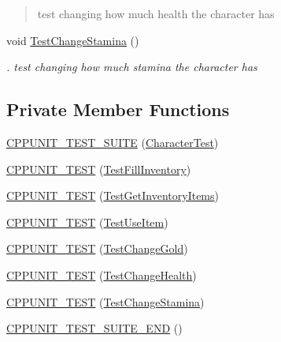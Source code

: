\begin{DoxyCompactItemize}
\begin{DoxyCompactList}\small\item\em \begin{quotation}
test changing how much health the character has \end{quotation}
\end{DoxyCompactList}\item 
void \hyperlink{classCharacterTest_ac61fb4a8c3c9b4a3f1d8e70856d4c9e0}{Test\-Change\-Stamina} ()
\begin{DoxyCompactList}\small\item\em . test changing how much stamina the character has \end{DoxyCompactList}\end{DoxyCompactItemize}
\subsection*{Private Member Functions}
\begin{DoxyCompactItemize}
\item 
\hyperlink{classCharacterTest_a9882f04c10eedb154b93bdeb19144182}{C\-P\-P\-U\-N\-I\-T\-\_\-\-T\-E\-S\-T\-\_\-\-S\-U\-I\-T\-E} (\hyperlink{classCharacterTest}{Character\-Test})
\item 
\hyperlink{classCharacterTest_ac9e2e2e32564afe8b256b4fd0b0e1867}{C\-P\-P\-U\-N\-I\-T\-\_\-\-T\-E\-S\-T} (\hyperlink{classCharacterTest_a348e663ab1846bbe64770dfd437bea49}{Test\-Fill\-Inventory})
\item 
\hyperlink{classCharacterTest_ab86d157d42dcc5acbda6e67308fa879a}{C\-P\-P\-U\-N\-I\-T\-\_\-\-T\-E\-S\-T} (\hyperlink{classCharacterTest_a0fae073fe364d5bb09e1488505f2f247}{Test\-Get\-Inventory\-Items})
\item 
\hyperlink{classCharacterTest_ae07c31a496c77343ff1afe5d6666619a}{C\-P\-P\-U\-N\-I\-T\-\_\-\-T\-E\-S\-T} (\hyperlink{classCharacterTest_a6510093a5bfccb8d325e00e0a15a81c2}{Test\-Use\-Item})
\item 
\hyperlink{classCharacterTest_ab8d48b1d88ca6958c7a702f6788e9b91}{C\-P\-P\-U\-N\-I\-T\-\_\-\-T\-E\-S\-T} (\hyperlink{classCharacterTest_a318991be56057b2587fcf357e13409ab}{Test\-Change\-Gold})
\item 
\hyperlink{classCharacterTest_a06162254e38a314ea52101a2e3f6271f}{C\-P\-P\-U\-N\-I\-T\-\_\-\-T\-E\-S\-T} (\hyperlink{classCharacterTest_a1e3ff758e3a47589ac31297cf62db9c4}{Test\-Change\-Health})
\item 
\hyperlink{classCharacterTest_ada430d4138cf07e076b4288602d425b8}{C\-P\-P\-U\-N\-I\-T\-\_\-\-T\-E\-S\-T} (\hyperlink{classCharacterTest_ac61fb4a8c3c9b4a3f1d8e70856d4c9e0}{Test\-Change\-Stamina})
\item 
\hyperlink{classCharacterTest_acbb1bb277e098afa5ba3ea70c3204a41}{C\-P\-P\-U\-N\-I\-T\-\_\-\-T\-E\-S\-T\-\_\-\-S\-U\-I\-T\-E\-\_\-\-E\-N\-D} ()
\end{DoxyCompactItemize}
